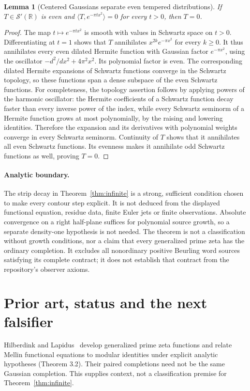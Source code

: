 \documentclass[11pt]{article}
\newtheorem{lemma}[theorem]{Lemma}
\theoremstyle{remark}\newtheorem{remark}[theorem]{Remark}
\newcommand{\R}{\mathbb R}\newcommand{\C}{\mathbb C}
\begin{document}
\begin{lemma}[Centered Gaussians separate even tempered distributions]
\label{lem:gaussians}
If $T\in\mathcal S'(\R)$ is even and
$\langle T,e^{-\pi tx^2}\rangle=0$ for every $t>0$, then $T=0$.
\end{lemma}
\begin{proof}
The map $t\mapsto e^{-\pi tx^2}$ is smooth with values in Schwartz
space on $t>0$. Differentiating at $t=1$ shows that $T$ annihilates
$x^{2k}e^{-\pi x^2}$ for every $k\geq0$. It thus annihilates every
even dilated Hermite function with Gaussian factor $e^{-\pi x^2}$,
using the oscillator $-d^2/dx^2+4\pi^2x^2$. Its polynomial factor is even.
The corresponding dilated Hermite
expansions of Schwartz functions converge in the Schwartz topology, so
these functions span a dense subspace of the even Schwartz functions.
For completeness, the topology assertion follows by applying powers of the
harmonic oscillator: the Hermite coefficients of a Schwartz function
decay faster than every inverse power of the index, while every Schwartz
seminorm of a Hermite function grows at most polynomially, by the raising
and lowering identities. Therefore the expansion and its derivatives with
polynomial weights converge in every Schwartz seminorm. Continuity of $T$
shows that it annihilates all even Schwartz functions. Its evenness makes
it annihilate odd Schwartz functions as well, proving $T=0$.
\end{proof}

\paragraph{Analytic boundary.}
The strip decay in Theorem~\ref{thm:infinite} is a strong, sufficient
condition chosen to make every contour step explicit. It is not deduced
from the displayed functional equation, residue data, finite Euler jets or
finite observations. Absolute convergence on a right half-plane suffices
for polynomial source growth, so a separate density-one hypothesis is not
needed. The theorem is not a classification without growth conditions,
nor a claim that every generalized prime zeta has the ordinary completion.
It excludes all nonordinary positive Beurling word sources satisfying its
complete contract; it does not establish that contract from the repository's
observer axioms.

\section{Prior art, status and the next falsifier}
Hilberdink and Lapidus~\cite{HL} develop generalized prime zeta functions
and relate Mellin functional equations to modular identities under explicit
analytic hypotheses (Theorem 3.2). Their paired completions need not be the
same Gaussian completion. This supplies context, not a classification
premise for Theorem~\ref{thm:infinite}.
\end{document}
